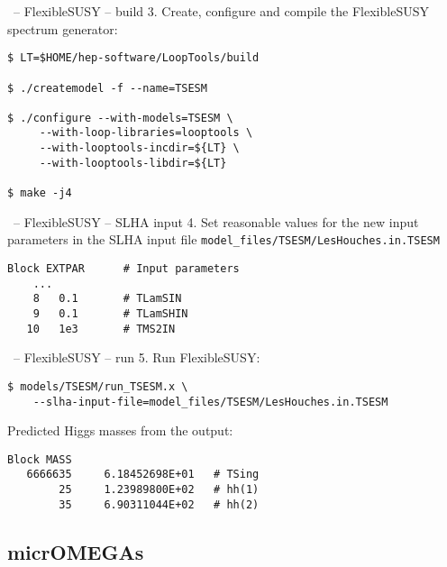 \documentclass[11pt]{beamer}
\begin{document}

\begin{frame}[fragile]{\insertsection\ -- FlexibleSUSY -- build}
  3. Create, configure and compile the FlexibleSUSY spectrum
  generator:
  \begin{lstlisting}
$ LT=$HOME/hep-software/LoopTools/build

$ ./createmodel -f --name=TSESM

$ ./configure --with-models=TSESM \
     --with-loop-libraries=looptools \
     --with-looptools-incdir=${LT} \
     --with-looptools-libdir=${LT}

$ make -j4\end{lstlisting}%
\end{frame}


\begin{frame}[fragile]{\insertsection\ -- FlexibleSUSY -- SLHA input}
  4. Set reasonable values for the new input parameters in the SLHA
  input file \texttt{model\_files/TSESM/LesHouches.in.TSESM}
  \begin{lstlisting}
Block EXTPAR      # Input parameters
    ...
    8   0.1       # TLamSIN
    9   0.1       # TLamSHIN
   10   1e3       # TMS2IN\end{lstlisting}%
\end{frame}


\begin{frame}[fragile]{\insertsection\ -- FlexibleSUSY -- run}
  5. Run FlexibleSUSY:
  \begin{lstlisting}
$ models/TSESM/run_TSESM.x \
    --slha-input-file=model_files/TSESM/LesHouches.in.TSESM\end{lstlisting}%
  Predicted Higgs masses from the output:
  \begin{lstlisting}
Block MASS
   6666635     6.18452698E+01   # TSing
        25     1.23989800E+02   # hh(1)
        35     6.90311044E+02   # hh(2)\end{lstlisting}
\end{frame}


\subsection{micrOMEGAs}
\end{document}
